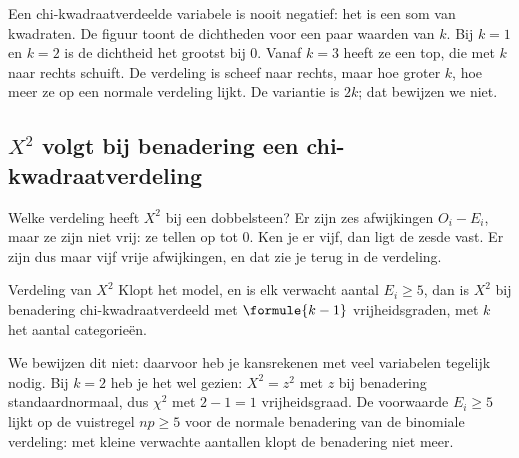 Een chi-kwadraatverdeelde variabele is nooit negatief: het is een som van kwadraten. De figuur toont de dichtheden voor een paar waarden van $k$. Bij $k = 1$ en $k = 2$ is de dichtheid het grootst bij 0. Vanaf $k = 3$ heeft ze een top, die met $k$ naar rechts schuift. De verdeling is scheef naar rechts, maar hoe groter $k$, hoe meer ze op een normale verdeling lijkt. De variantie is $2k$; dat bewijzen we niet.


\subsection{$X^2$ volgt bij benadering een chi-kwadraatverdeling}

Welke verdeling heeft $X^2$ bij een dobbelsteen? Er zijn zes afwijkingen $O_i - E_i$, maar ze zijn niet vrij: ze tellen op tot 0. Ken je er vijf, dan ligt de zesde vast. Er zijn dus maar vijf vrije afwijkingen, en dat zie je terug in de verdeling.

\begin{theorie}
\begin{stelling}{Verdeling van $X^2$}
Klopt het model, en is elk verwacht aantal $E_i \geqslant 5$, dan is $X^2$ bij benadering chi-kwadraatverdeeld met $\formule{k - 1}$ vrijheidsgraden, met $k$ het aantal categorieën.
\end{stelling}
\end{theorie}

We bewijzen dit niet: daarvoor heb je kansrekenen met veel variabelen tegelijk nodig. Bij $k = 2$ heb je het wel gezien: $X^2 = z^2$ met $z$ bij benadering standaardnormaal, dus $\chi^2$ met $2 - 1 = 1$ vrijheidsgraad. De voorwaarde $E_i \geqslant 5$ lijkt op de vuistregel $np \geqslant 5$ voor de normale benadering van de binomiale verdeling: met kleine verwachte aantallen klopt de benadering niet meer.

